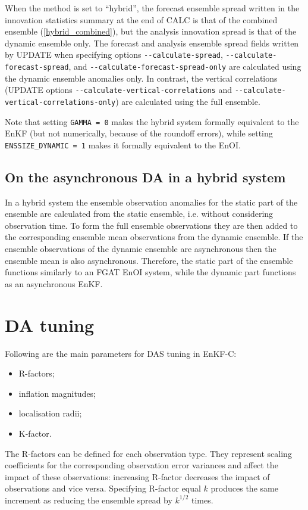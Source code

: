 \documentclass[11pt]{report}
\begin{document}
When the method is set to ``hybrid'', the forecast ensemble spread written in the innovation statistics summary at the end of CALC is that of the combined ensemble (\ref{hybrid_combined}), but the analysis innovation spread is that of the dynamic ensemble only.
The forecast and analysis ensemble spread fields written by UPDATE when specifying options \verb|--calculate-spread|, \verb|--calculate-forecast-spread|, and \verb|--calculate-forecast-spread-only| are calculated using the dynamic ensemble anomalies only.
In contrast, the vertical correlations (UPDATE options \verb|--calculate-vertical-correlations| and \verb|--calculate-vertical-correlations-only|) are calculated using the full ensemble.

Note that setting \verb|GAMMA = 0| makes the hybrid system formally equivalent to the EnKF (but not numerically, because of the roundoff errors), while setting \verb|ENSSIZE_DYNAMIC = 1| makes it formally equivalent to the EnOI.

\subsection{On the asynchronous DA in a hybrid system}

In a hybrid system the ensemble observation anomalies for the static part of the ensemble are calculated from the static ensemble, i.e. without considering observation time.
To form the full ensemble observations they are then added to the corresponding ensemble mean observations from the dynamic ensemble.
If the ensemble observations of the dynamic ensemble are asynchronous then the ensemble mean is also asynchronous.
Therefore, the static part of the ensemble functions similarly to an FGAT EnOI system, while the dynamic part functions as an asynchronous EnKF.

\section{DA tuning}
\label{sec:datuning}

Following are the main parameters for DAS tuning in EnKF-C:
\begin{itemize}
\item R-factors;
\item inflation magnitudes;
\item localisation radii;
\item K-factor.
\end{itemize}

The R-factors can be defined for each observation type.
They represent scaling coefficients for the corresponding observation error variances and affect the impact of these observations: increasing R-factor decreases the impact of observations and vice versa.
Specifying R-factor equal $k$ produces the same increment as reducing the ensemble spread by $k^{1/2}$ times.
\end{document}
